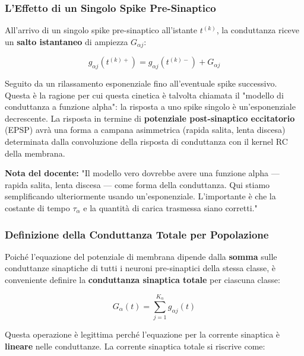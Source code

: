 \subsubsection{L'Effetto di un Singolo Spike Pre-Sinaptico}

All'arrivo di un singolo spike pre-sinaptico all'istante $t^{(k)}$, la conduttanza riceve un \textbf{salto istantaneo} di ampiezza $G_{\alpha j}$:

\begin{equation}
g_{\alpha j}(t^{(k)+}) = g_{\alpha j}(t^{(k)-}) + G_{\alpha j}
\end{equation}

Seguito da un rilassamento esponenziale fino all'eventuale spike successivo. Questa è la ragione per cui questa cinetica è talvolta chiamata il "modello di conduttanza a funzione alpha": la risposta a uno spike singolo è un'esponenziale decrescente. La risposta in termine di \textbf{potenziale post-sinaptico eccitatorio} (EPSP) avrà una forma a campana asimmetrica (rapida salita, lenta discesa) determinata dalla convoluzione della risposta di conduttanza con il kernel RC della membrana.

\begin{tcolorbox}[colback=gray!5, colframe=gray!40, arc=2mm, boxrule=0.5pt]
\textbf{Nota del docente:} "Il modello vero dovrebbe avere una funzione alpha — rapida salita, lenta discesa — come forma della conduttanza. Qui stiamo semplificando ulteriormente usando un'esponenziale. L'importante è che la costante di tempo $\tau_\alpha$ e la quantità di carica trasmessa siano corretti."
\end{tcolorbox}

\subsubsection{Definizione della Conduttanza Totale per Popolazione}

Poiché l'equazione del potenziale di membrana dipende dalla \textbf{somma} sulle conduttanze sinaptiche di tutti i neuroni pre-sinaptici della stessa classe, è conveniente definire la \textbf{conduttanza sinaptica totale} per ciascuna classe:

\begin{equation}
G_\alpha(t) = \sum_{j=1}^{K_\alpha} g_{\alpha j}(t)
\end{equation}

Questa operazione è legittima perché l'equazione per la corrente sinaptica è \textbf{lineare} nelle conduttanze. La corrente sinaptica totale si riscrive come:

